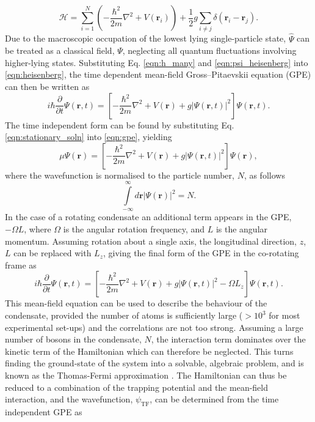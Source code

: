 \begin{equation}\label{eqn:h_many}
\mathcal{H} = \displaystyle\sum\limits_{i=1}^N \left( -\frac{\hbar^2}{2m}\nabla^2  + V(\textbf{r}_i)\right) + \frac{1}{2}g\displaystyle\sum\limits_{i\neq j}\delta(\textbf{r}_i - \textbf{r}_j).
\end{equation}
Due to the macroscopic occupation of the lowest lying single-particle state, $\hat{\Psi}$ can be treated as a classical field, $\Psi$, neglecting all quantum fluctuations involving higher-lying states. Substituting Eq. \eqref{eqn:h_many} and \eqref{eqn:psi_heisenberg} into \eqref{eqn:heisenberg}, the time dependent mean-field Gross--Pitaevskii equation (GPE) can then be written as
\begin{equation}\label{eqn:gpe}
i\hbar\frac{\partial}{\partial t}\Psi(\textbf{r},t) = \left[-\frac{\hbar^2}{2m}\nabla^2 + V(\textbf{r}) + g\vert\Psi(\textbf{r},t)\vert^2 \right]\Psi(\textbf{r},t).
\end{equation}
The time independent form can be found by substituting Eq. \eqref{eqn:stationary_soln} into \eqref{eqn:gpe}, yielding
\begin{equation}
\mu\Psi(\textbf{r}) = \left[-\frac{\hbar^2}{2m}\nabla^2 + V(\textbf{r}) + g\vert\Psi(\textbf{r},t)\vert^2 \right]\Psi(\textbf{r}),
\end{equation}
where the wavefunction is normalised to the particle number, $N$, as follows
\begin{equation}\label{eqn:norm}
\displaystyle\int\limits_{-\infty}^{\infty}d\textbf{r} \left\vert \Psi\left(\textbf{r}\right) \right\vert^2 = N.
\end{equation}
In the case of a rotating condensate an additional term appears in the GPE, $-\Omega L$, where $\Omega$ is the angular rotation frequency, and $L$ is the angular momentum. Assuming rotation about a single axis, the longitudinal direction, $z$, $L$ can be replaced with $L_z$, giving the final form of the GPE in the co-rotating frame as
\begin{equation}\label{eqn:gpe_rotation}
i\hbar\frac{\partial}{\partial t}\Psi(\textbf{r},t) = \left[-\frac{\hbar^2}{2m}\nabla^2 + V(\textbf{r}) + g\vert\Psi(\textbf{r},t)\vert^2 - \Omega L_z  \right]\Psi(\textbf{r},t).
\end{equation}
This mean-field equation can be used to describe the behaviour of the condensate, provided the number of atoms is sufficiently large ($>10^3$ for most experimental set-ups) and the correlations are not too strong. Assuming a large number of bosons in the condensate, $N$, the interaction term dominates over the kinetic term of the Hamiltonian which can therefore be neglected. This turns finding the ground-state of the system into a solvable, algebraic problem, and is known as the Thomas-Fermi approximation \cite[~p. 84]{BK:Ueda_2010}. The Hamiltonian can thus be reduced to a combination of the trapping potential and the mean-field interaction, and the wavefunction, $\psi_{\textrm{TF}}$, can be determined from the time independent GPE as
